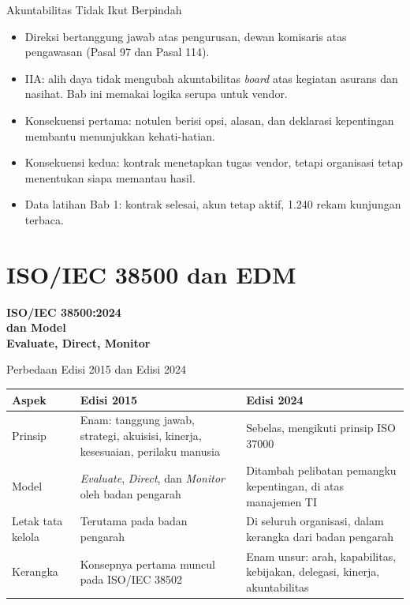\documentclass[aspectratio=169, table, 12pt]{beamer}
\begin{document}
\begin{frame}{{\Large Akuntabilitas Tidak Ikut Berpindah}}
  \vspace{4pt}
  \small
  \begin{itemize}
    \item Direksi bertanggung jawab atas pengurusan, dewan komisaris atas pengawasan (Pasal 97 dan
          Pasal 114).
    \item IIA: alih daya tidak mengubah akuntabilitas \textit{board} atas kegiatan asurans dan
          nasihat. Bab ini memakai logika serupa untuk vendor.
    \item Konsekuensi pertama: notulen berisi opsi, alasan, dan deklarasi kepentingan membantu
          menunjukkan kehati-hatian.
    \item Konsekuensi kedua: kontrak menetapkan tugas vendor, tetapi organisasi tetap menentukan
          siapa memantau hasil.
    \item Data latihan Bab 1: kontrak selesai, akun tetap aktif, 1.240 rekam kunjungan terbaca.
  \end{itemize}
\end{frame}

\section{ISO/IEC 38500 dan EDM}

\begin{frame}{\hfill}
  \centering
  \Huge{\textbf{ISO/IEC 38500:2024\\dan Model\\Evaluate, Direct, Monitor}}
\end{frame}

\begin{frame}{{\Large Perbedaan Edisi 2015 dan Edisi 2024}}
  \vspace{4pt}
  \footnotesize
  \begin{tabularx}{\textwidth}{|>{\raggedright\arraybackslash}p{}|>{\raggedright\arraybackslash}X|>{\raggedright\arraybackslash}X|}
    \hline
    \textbf{Aspek} & \textbf{Edisi 2015} & \textbf{Edisi 2024} \\ \hline
    Prinsip & Enam: tanggung jawab, strategi, akuisisi, kinerja, kesesuaian, perilaku manusia &
    Sebelas, mengikuti prinsip ISO 37000 \\ \hline
    Model & \textit{Evaluate}, \textit{Direct}, dan \textit{Monitor} oleh badan pengarah & Ditambah
    pelibatan pemangku kepentingan, di atas manajemen TI \\ \hline
    Letak tata kelola & Terutama pada badan pengarah & Di seluruh organisasi, dalam kerangka dari
    badan pengarah \\ \hline
    Kerangka & Konsepnya pertama muncul pada ISO/IEC 38502 & Enam unsur: arah, kapabilitas, kebijakan,
    delegasi, kinerja, akuntabilitas \\ \hline
  \end{tabularx}
\end{frame}
\end{document}
